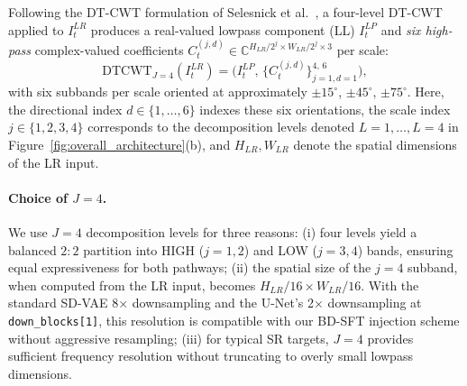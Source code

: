 Following the DT-CWT formulation of Selesnick et 
al.~\cite{selesnick2005dtcwt}, a four-level DT-CWT applied to 
$I^{LR}_t$ produces a real-valued lowpass component (LL) 
$I^{LP}_t$ and \emph{six high-pass} complex-valued coefficients 
$C^{(j,d)}_t \in \mathbb{C}^{H_{LR}/2^j \times W_{LR}/2^j \times 3}$ 
per scale:
\begin{equation}
    \mathrm{DTCWT}_{J=4}(I^{LR}_t) = 
    \big( I^{LP}_t,\, \{C^{(j,d)}_t\}_{j=1, d=1}^{4,\,6} \big),
    \label{eq:dtcwt_decomp}
\end{equation}
with six subbands per scale oriented at approximately $\pm 15^\circ$, 
$\pm 45^\circ$, $\pm 75^\circ$. Here, the directional index $d \in 
\{1, \ldots, 6\}$ indexes these six orientations, the scale index 
$j \in \{1, 2, 3, 4\}$ corresponds to the decomposition levels 
denoted $L{=}1, \ldots, L{=}4$ in 
Figure~\ref{fig:overall_architecture}(b), and $H_{LR}, W_{LR}$ 
denote the spatial dimensions of the LR input.

\paragraph{Choice of $J=4$.}
We use $J=4$ decomposition levels for three reasons: 
(i) four levels yield a balanced $2{:}2$ partition into HIGH 
($j=1, 2$) and LOW ($j=3, 4$) bands, ensuring equal expressiveness 
for both pathways; (ii) the spatial size of the $j=4$ subband, 
when computed from the LR input, becomes $H_{LR}/16 \times 
W_{LR}/16$. With the standard SD-VAE 8$\times$ downsampling and 
the U-Net's 2$\times$ downsampling at \texttt{down\_blocks[1]}, 
this resolution is compatible with our BD-SFT injection scheme 
without aggressive resampling; (iii) for typical SR targets, $J=4$ 
provides sufficient frequency resolution without truncating to 
overly small lowpass dimensions.

